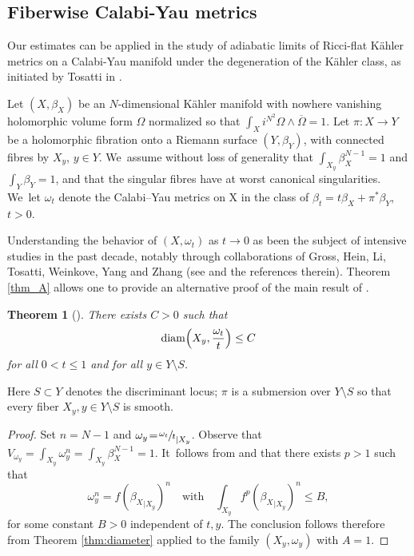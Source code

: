 \documentclass[10pt]{amsart}
\DeclareMathOperator{\diam}{diam}
\newtheorem{theorem}{Theorem}[section]
\theoremstyle{definition}
\begin{document}
\subsection{Fiberwise Calabi-Yau metrics} \label{sec:ke}

Our estimates can be applied in
the study of adiabatic limits of Ricci-flat Kähler metrics on a Calabi-Yau manifold
under the degeneration of the Kähler class, as initiated by Tosatti in \cite{Tos10}.

Let $(X,\beta_X)$ be an $N$-dimensional Kähler manifold with nowhere vanishing holomorphic volume form $\Omega$
normalized so that $\int_X i^{N^2} \Omega \wedge \overline{\Omega}=1$.
Let $\pi:X \rightarrow Y$ be a holomorphic fibration onto a Riemann surface $(Y,\beta_Y)$, with connected fibres
by $X_y$, $y \in Y$. We~assume without loss of generality that $\int_{X_y} \beta_X^{N-1}=1$ and $\int_Y \beta_Y=1$,
and that the singular fibres have at worst canonical singularities. We~let $\omega_t$ denote the Calabi–Yau metrics on X in the class of
$\beta_t=t\beta_X+ \pi^*\beta_Y$, $t>0$.

Understanding the behavior of $(X,\omega_t)$ as $t \rightarrow 0$ as been the subject of intensive studies
in the past decade, notably through collaborations of
Gross, Hein, Li, Tosatti, Weinkove, Yang and Zhang (see \cite{Tos20} and the references therein).
Theorem \ref{thm_A} allows one to provide an alternative proof of the main result of \cite{Li23}.

\begin{theorem}[{\cite[Th.\,1.4]{Li23}}]
There exists $C>0$ such that
\[
\diam \Bigl(X_y, \frac{\omega_t}{t} \Bigr) \leq C
\]
for all $0<t \leq 1$ and for all $y \in Y\setminus S$.
\end{theorem}

Here $S\subset Y$ denotes the discriminant locus; $\pi$ is a submersion over $Y\setminus S$ so that every fiber $X_y, y\in Y\setminus S$ is smooth.

\begin{proof}
Set $n\!=\!N-1$ and $\omega_y\!=\!{{\sfrac{\omega_t}{t}}}_{|X_y}$.
Observe that $V_{\omega_y}\!=\!\int_{X_y} \omega_y^n\!=\!\int_{X_y} \beta_X^{N-1}\!=\!1$. It~follows from \cite[Prop.\,2.3]{Li23} and \cite[Lem.\,4.4]{DnGG23} that there exists $p>1$ such that
\[
\omega_y^n =f ({\beta_X}_{|X_y})^n
\quad \text{with} \quad
\int_{X_y} f^p ({\beta_X}_{|X_y})^n \leq B,
\]
for some constant $B>0$ independent of $t,y$.
The conclusion follows therefore from Theorem \ref{thm:diameter}
applied to the family $(X_y,\omega_y)$ with $A=1$.
\end{proof}
\end{document}
